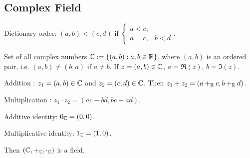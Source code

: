 \documentclass[]{article}
\begin{document}
\subsection*{Complex Field}

Dictionary order: $(a,b) < (c,d)$ if $\begin{cases} a<c , \\ a=c, & b<d\end{cases}$.

\begin{definition}
	Set of all complex numbers $\mathbb{C} :=\{(a,b):a,b\in\mathbb{R}\}$, where $(a,b)$ is an ordered pair, i.e. $(a,b)\neq (b,a)$ if $a\neq b$.
	If $z = (a,b)\in\mathbb{C}$, $a = \Re(z)$, $b=\Im(z)$.
\end{definition}

Addition : $z_1= (a,b)\in\mathbb{C}$ and $z_2 = (c,d)\in\mathbb{C}$. Then $z_1+z_2 = (a +_{\mathbb{R}} c, b+_{\mathbb{R}} d)$.

Multiplication : $z_1\cdot z_2 = (ac-bd, bc+ad)$.

Additive identity: $0_{\mathbb{C}} = (0,0)$.

Multiplicative identity: $1_{\mathbb{C}} = (1,0)$.

Then $(\mathbb{C},+_{\mathbb{C}},\cdot_{\mathbb{C}})$ is a field.
\end{document}
